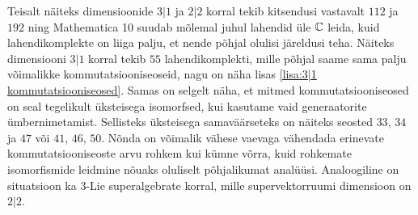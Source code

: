 Teisalt näiteks dimensioonide $3|1$ ja $2|2$ korral tekib kitsendusi vastavalt
$112$ ja $192$ ning Mathematica 10 suudab mõlemal juhul lahendid üle $\mathbb{C}$ leida,
kuid lahendikomplekte on liiga palju, et nende põhjal olulisi järeldusi teha.
Näiteks dimensiooni $3|1$ korral tekib $55$ lahendikomplekti, mille põhjal
saame sama palju võimalikke kommutatsiooniseoseid, nagu on näha lisas
\ref{lisa:3|1 kommutatsiooniseosed}. Samas on selgelt näha, et mitmed
kommutatsiooniseosed on seal tegelikult üksteisega isomorfsed, kui kasutame
vaid generaatorite ümbernimetamist. Sellisteks üksteisega samaväärseteks
on näiteks seosted $33$, $34$ ja $47$ või $41$, $46$, $50$. Nõnda on võimalik
vähese vaevaga vähendada erinevate kommutatsiooniseoste arvu rohkem kui kümne
võrra, kuid rohkemate isomorfismide leidmine nõuaks oluliselt põhjalikumat
analüüsi. Analoogiline on situatsioon ka $3$-Lie superalgebrate korral, mille
supervektorruumi dimensioon on $2|2$.
